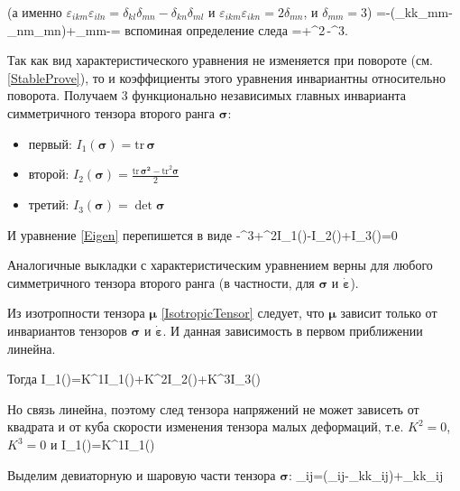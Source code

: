 \documentclass[main.tex]{subfiles}
\begin{document}
(а именно $\varepsilon_{ikm}\varepsilon_{iln}=\delta_{kl}\delta_{mn}-\delta_{kn}\delta_{ml}$ и $\varepsilon_{ikm}\varepsilon_{ikn}=2\delta_{mn}$, и $\delta_{mm}=3$)
\beq
=\det{\symbf{\sigma}}-\left(\sigma_{kk}\sigma_{mm}-\sigma_{nm}\sigma_{mn}\right)+\sigma_{mm}-=
\eeq
вспоминая определение следа
\beq
=+\lambda^2\cdot{}\,\symbf{\sigma}-\lambda^3.
\eeq

Так как вид характеристического уравнения не изменяется при повороте (см. \eqref{StableProve}), то и коэффициенты этого уравнения инвариантны относительно поворота. Получаем 3 функционально независимых главных инварианта симметричного тензора второго ранга $\symbf{\sigma}$:
\begin{itemize}
	\item первый: $I_1(\symbf{\sigma})=\text{tr}\,\symbf{\sigma}$
	\item второй: $\displaystyle{}I_2(\symbf{\sigma})=\frac{\text{tr}\,\symbf{\sigma^2}-\text{tr}^2\symbf{\sigma}}{2}$
	\item третий: $I_3(\symbf{\sigma})=\det{\symbf{\sigma}}$
\end{itemize}

И уравнение \eqref{Eigen} перепишется в виде
\beq
-\lambda^3+\lambda^2\cdot I_1(\symbf{\sigma})-\lambda\cdot I_2(\symbf{\sigma})+I_3(\symbf{\sigma})=0
\eeq

Аналогичные выкладки с характеристическим уравнением верны для любого симметричного тензора второго ранга (в частности, для $\symbf{\sigma}$ и $\symbf{\dot{\varepsilon}}$).

Из изотропности тензора $\symbf{\mu}$ \eqref{IsotropicTensor} следует, что $\symbf{\mu}$ зависит только от инвариантов тензоров $\symbf{\sigma}$ и $\symbf{\dot{\varepsilon}}$. И данная зависимость в первом приближении линейна.

Тогда
\beq
I_1(\symbf{\sigma})=K^1I_1(\symbf{\dot{\varepsilon}})+K^2I_2(\symbf{\dot{\varepsilon}})+K^3I_3(\symbf{\dot{\varepsilon}})
\eeq

Но связь линейна, поэтому след тензора напряжений не может зависеть от квадрата и от куба скорости изменения тензора малых деформаций, т.е. $K^2=0$, $K^3=0$ и
\beq\label{TraceConnect}
I_1(\symbf{\sigma})=K^1I_1(\symbf{\dot{\varepsilon}})
\eeq

Выделим девиаторную и шаровую части тензора $\symbf{\sigma}$:
\beq\label{SpherePart}
\sigma_{ij}=\left(\sigma_{ij}-\sigma_{kk}\delta_{ij}\right)+\sigma_{kk}\delta_{ij}
\eeq
\end{document}
